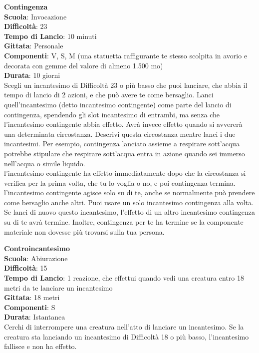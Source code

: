 \begin{multicols}{2}
\medskip\textbf{Contingenza}\\
\textbf{Scuola}: Invocazione\\
\textbf{Difficoltà}:  23\\
\textbf{Tempo di Lancio}: 10 minuti\\
\textbf{Gittata}: Personale\\
\textbf{Componenti}: V, S, M (una statuetta raffigurante te stesso scolpita in avorio e decorata con gemme del valore di almeno 1.500 mo)\\
\textbf{Durata}: 10 giorni\\
Scegli un incantesimo di Difficoltà 23 o più basso che puoi lanciare, che abbia il tempo di lancio di 2 azioni, e che può avere te come bersaglio. Lanci quell'incantesimo (detto incantesimo contingente) come parte del lancio di contingenza, spendendo gli slot incantesimo di entrambi, ma senza che l'incantesimo contingente abbia effetto. Avrà invece effetto quando si avvererà una determinata circostanza. Descrivi questa circostanza mentre lanci i due incantesimi. Per esempio, contingenza lanciato assieme a respirare sott’acqua potrebbe stipulare che respirare sott’acqua entra in azione quando sei immerso nell'acqua o simile liquido.\\
l'incantesimo contingente ha effetto immediatamente dopo che la circostanza si verifica per la prima volta, che tu lo voglia o no, e poi contingenza termina. l'incantesimo contingente agisce solo su di te, anche se normalmente può prendere come bersaglio anche altri. Puoi usare un solo incantesimo contingenza alla volta. Se lanci di nuovo questo incantesimo, l’effetto di un altro incantesimo contingenza su di te avrà termine. Inoltre, contingenza per te ha termine se la componente materiale non dovesse più trovarsi sulla tua persona.


\medskip\textbf{Controincantesimo}\\
\textbf{Scuola}: Abiurazione\\
\textbf{Difficoltà}:  15\\
\textbf{Tempo di Lancio}: 1 reazione, che effettui quando vedi una creatura entro 18 metri da te lanciare un incantesimo\\
\textbf{Gittata}: 18 metri\\
\textbf{Componenti}: S \\
\textbf{Durata}: Istantanea\\
Cerchi di interrompere una creatura nell'atto di lanciare un incantesimo. Se la creatura sta lanciando un incantesimo di Difficoltà 18 o più basso, l'incantesimo fallisce e non ha effetto. 



\end{multicols}
